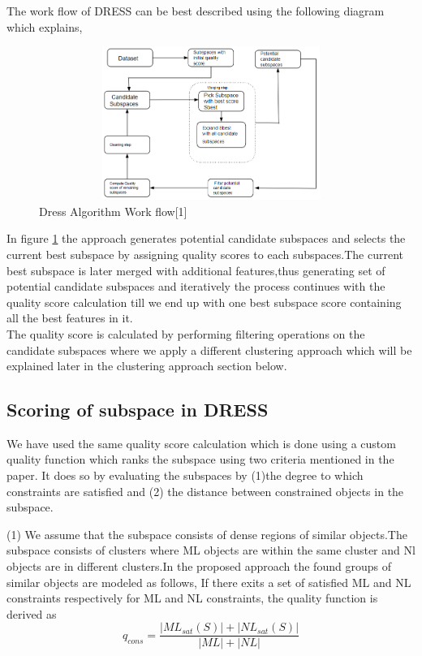 \documentclass[10pt, conference, compsocconf]{IEEEtran}
\begin{document}
The work flow of DRESS can be best described using the following diagram which explains,

\begin{figure}[H]
\centering
\includegraphics[width=20cm,height=5cm,keepaspectratio]{dress.PNG}
\caption{\label{fig:1-Dress Work flow} Dress Algorithm Work flow[1]}
\end{figure}

In figure \ref{fig:1-Dress Work flow} the approach generates potential candidate subspaces  and selects the current best subspace by assigning quality scores to each subspaces.The current best subspace is later merged with additional features,thus generating set of potential candidate subspaces and iteratively the process continues with the quality score calculation till we end up with one best subspace score containing all the best features in it.\\

The quality score is calculated by performing filtering operations on the candidate subspaces where we apply a different clustering approach which will be explained later in the clustering approach section below.

\subsection{Scoring of subspace in DRESS}
We have used the same quality score calculation which is done using a custom quality function which ranks the subspace using two criteria mentioned in the paper. It does so by evaluating the subspaces by 
(1)the degree to which constraints are satisfied and (2) the distance between constrained objects in the subspace.\cite{tommy}

(1) We assume that the subspace consists of dense regions of similar objects.The subspace consists of clusters where ML objects are within the same cluster and Nl objects are in different clusters.In the proposed
approach the found groups of similar objects are modeled as follows, If there exits a set of satisfied ML and NL constraints respectively for ML and NL constraints, the quality function is derived as\\
\begin{equation}
q_{cons} = \dfrac{|ML_{sat}(S)|+|NL_{sat}(S)|}{|ML|+|NL|}
\end{equation}
\end{document}
